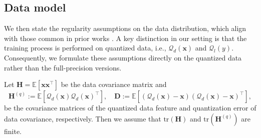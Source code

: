 \documentclass[11pt, letterpaper]{article}
\begin{document}
\subsection{Data model} 
We then state the regularity assumptions on the data distribution, which align with those common in prior works \citep{zou2023benign, lin2024scaling}. A key distinction in our setting is that the training process is performed on quantized data, i.e., $\mathcal{Q}_d(\mathbf{x})$ and $\mathcal{Q}_l(y)$. Consequently, we formulate these assumptions directly on the quantized data rather than the full-precision versions.
\begin{assumption}
    \label{ass: addd quantized}
    Let $\mathbf H=\mathbb E[\mathbf x\mathbf x^\top]$ be the data covariance matrix and 
    \begin{equation*}
        \mathbf{H}^{(q)}:=\mathbb{E}[\mathcal{Q}_d(\mathbf{x})\mathcal{Q}_d(\mathbf{x})^\top],\quad \mathbf{D}:=\mathbb{E}[(\mathcal{Q}_d(\mathbf{x})-\mathbf{x})(\mathcal{Q}_d(\mathbf{x})-\mathbf{x})^\top],
    \end{equation*}
    be the covariance matrices of the quantized data feature and quantization error of data covariance, respectively. Then we assume that $\mathrm{tr}(\mathbf{H})$ and $\mathrm{tr}(\mathbf{H}^{(q)})$ are finite.
\end{assumption}
\end{document}

